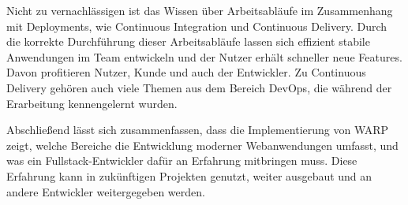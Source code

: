 Nicht zu vernachlässigen ist das Wissen über Arbeitsabläufe im Zusammenhang mit Deployments, wie Continuous Integration und Continuous Delivery. Durch die korrekte Durchführung dieser Arbeitsabläufe lassen sich effizient stabile Anwendungen im Team entwickeln und der Nutzer erhält schneller neue Features. Davon profitieren Nutzer, Kunde und auch der Entwickler. Zu Continuous Delivery gehören auch viele Themen aus dem Bereich DevOps, die während der Erarbeitung kennengelernt wurden.

Abschließend lässt sich zusammenfassen, dass die Implementierung von WARP zeigt, welche Bereiche die Entwicklung moderner Webanwendungen umfasst, und was ein Fullstack-Entwickler dafür an Erfahrung mitbringen muss. Diese Erfahrung kann in zukünftigen Projekten genutzt, weiter ausgebaut und an andere Entwickler weitergegeben werden.
